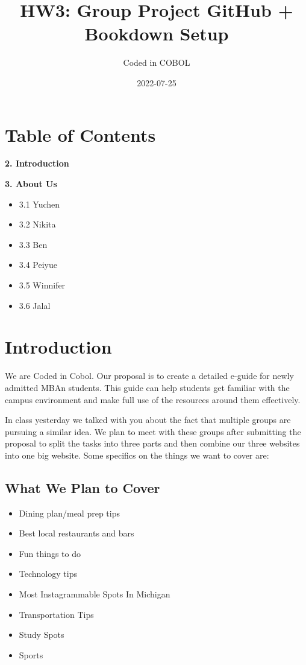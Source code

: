 \documentclass[
]{book}
\title{HW3: Group Project GitHub + Bookdown Setup}
\author{Coded in COBOL}
\date{2022-07-25}
\providecommand{\tightlist}{%
  \setlength{\itemsep}{0pt}\setlength{\parskip}{0pt}}
\theoremstyle{definition}
\theoremstyle{definition}
\theoremstyle{definition}
\theoremstyle{definition}
\theoremstyle{remark}
\begin{document}
\maketitle

{
\setcounter{tocdepth}{1}
\tableofcontents
}
\hypertarget{table-of-contents}{%
\chapter{Table of Contents}\label{table-of-contents}}

\textbf{2. Introduction}

\textbf{3. About Us}

\begin{itemize}
\tightlist
\item
  3.1 Yuchen
\item
  3.2 Nikita
\item
  3.3 Ben
\item
  3.4 Peiyue
\item
  3.5 Winnifer
\item
  3.6 Jalal
\end{itemize}

\hypertarget{introduction}{%
\chapter{Introduction}\label{introduction}}

We are Coded in Cobol. Our proposal is to create a detailed e-guide for newly admitted MBAn students. This guide can help students get familiar with the campus environment and make full use of the resources around them effectively.

In class yesterday we talked with you about the fact that multiple groups are pursuing a similar idea. We plan to meet with these groups after submitting the proposal to split the tasks into three parts and then combine our three websites into one big website. Some specifics on the things we want to cover are:

\hypertarget{what-we-plan-to-cover}{%
\section{What We Plan to Cover}\label{what-we-plan-to-cover}}

\begin{itemize}
\tightlist
\item
  Dining plan/meal prep tips
\item
  Best local restaurants and bars
\item
  Fun things to do
\item
  Technology tips
\item
  Most Instagrammable Spots In Michigan
\item
  Transportation Tips
\item
  Study Spots
\item
  Sports
\end{itemize}
\end{document}
